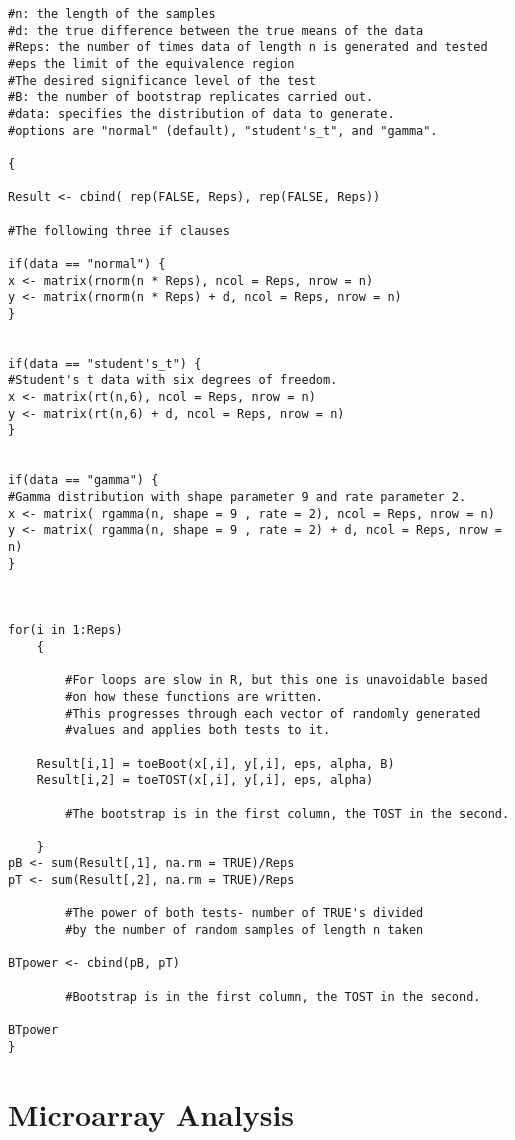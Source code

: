 \begin{verbatim}
#n: the length of the samples
#d: the true difference between the true means of the data
#Reps: the number of times data of length n is generated and tested
#eps the limit of the equivalence region
#The desired significance level of the test
#B: the number of bootstrap replicates carried out.
#data: specifies the distribution of data to generate.
#options are "normal" (default), "student's_t", and "gamma".

{

Result <- cbind( rep(FALSE, Reps), rep(FALSE, Reps))

#The following three if clauses 

if(data == "normal") {
x <- matrix(rnorm(n * Reps), ncol = Reps, nrow = n)
y <- matrix(rnorm(n * Reps) + d, ncol = Reps, nrow = n) 
}


if(data == "student's_t") {
#Student's t data with six degrees of freedom.
x <- matrix(rt(n,6), ncol = Reps, nrow = n)
y <- matrix(rt(n,6) + d, ncol = Reps, nrow = n) 
}


if(data == "gamma") {
#Gamma distribution with shape parameter 9 and rate parameter 2.
x <- matrix( rgamma(n, shape = 9 , rate = 2), ncol = Reps, nrow = n)
y <- matrix( rgamma(n, shape = 9 , rate = 2) + d, ncol = Reps, nrow = n) 
}



for(i in 1:Reps)
 	{

		#For loops are slow in R, but this one is unavoidable based
		#on how these functions are written.
		#This progresses through each vector of randomly generated 
		#values and applies both tests to it. 

	Result[i,1] = toeBoot(x[,i], y[,i], eps, alpha, B)
	Result[i,2] = toeTOST(x[,i], y[,i], eps, alpha)

		#The bootstrap is in the first column, the TOST in the second.

	}	
pB <- sum(Result[,1], na.rm = TRUE)/Reps
pT <- sum(Result[,2], na.rm = TRUE)/Reps

		#The power of both tests- number of TRUE's divided 
		#by the number of random samples of length n taken

BTpower <- cbind(pB, pT) 

		#Bootstrap is in the first column, the TOST in the second.

BTpower
}

\end{verbatim}

\section{Microarray Analysis}

